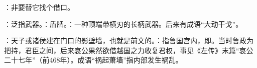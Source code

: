 {\begin{lyblobitemize}
\item {}：非要替它找个借口。
\item {}：泛指武器。：盾牌。：一种顶端带横刃的长柄武器。后来有成语“大动干戈”。

\item {}：天子或诸侯建在门口的影壁墙，也就是前文的。：指鲁国宫内，即。当时鲁政为把持，君臣之间，后来哀公果然欲借越国之力收复君权，事见《左传》末篇“哀公二十七年”（前468年）。成语“祸起萧墙”指内部发生祸乱。
\end{lyblobitemize}
}
{}


